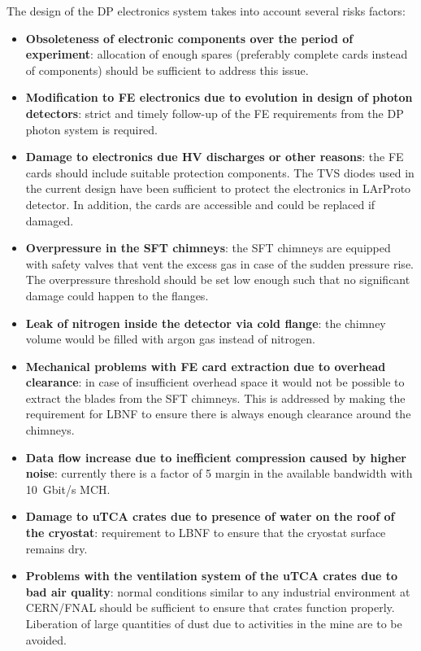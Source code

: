 The design of the DP electronics system takes into account several risks factors:
\begin{itemize}
\item{\textbf{Obsoleteness of electronic components over the period of experiment}: allocation of enough spares (preferably complete cards instead of components) should be sufficient to address this issue. }
\item{\textbf{Modification to FE electronics due to evolution in design of photon detectors}: strict and timely follow-up of the FE requirements from the DP photon system is required.}
\item{\textbf{Damage to electronics due HV discharges or other reasons}: the FE cards should include suitable protection components. The TVS diodes used in the current design have been sufficient to protect the electronics in LArProto detector. In addition, the cards are accessible and could be replaced if damaged. }
\item{\textbf{Overpressure in the SFT chimneys}: the SFT chimneys are equipped with safety valves that vent the excess gas in case of the sudden pressure rise. The overpressure threshold should be set low enough such that no significant damage could happen to the flanges. }
\item{\textbf{Leak of nitrogen inside the detector via cold flange}: the chimney volume would be filled with argon gas instead of nitrogen.}
\item{\textbf{Mechanical problems with FE card extraction due to overhead clearance}: in case of insufficient overhead space it would not be possible to extract the blades from the SFT chimneys. This is addressed by making the requirement for LBNF to ensure there is always enough clearance around the chimneys.}
\item{\textbf{Data flow increase due to inefficient compression caused by higher noise}: currently there is a factor of \num{5} margin in the available bandwidth with \SI{10}{Gbit/s} MCH.}
\item{\textbf{Damage to uTCA crates due to presence of water on the roof of the cryostat}: requirement to LBNF to ensure that the cryostat surface remains dry.}
\item{\textbf{Problems with the ventilation system of the uTCA crates due to bad air quality}: normal conditions similar to any industrial environment at CERN/FNAL should be sufficient to ensure that crates function properly. Liberation of large quantities of dust due to activities in the mine are to be avoided.}
\end{itemize}

